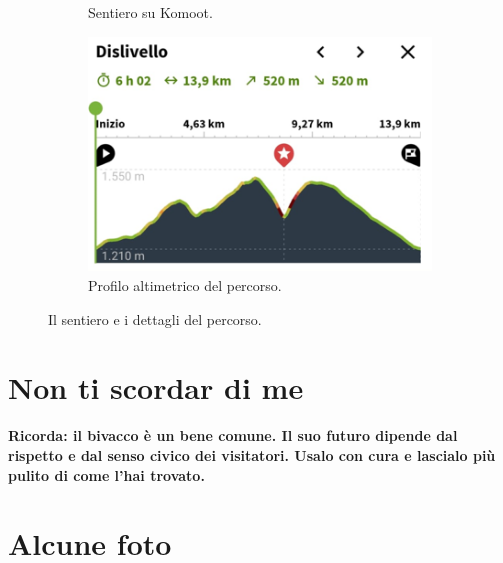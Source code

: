 \documentclass{article}
\begin{document}
\begin{figure}[htbp!]
\begin{subfigure}[t]{0.45\textwidth}
        \caption{Sentiero su Komoot.}
        \label{fig:foto_corta1}
        \vspace{1em} %
        \includegraphics[width=\textwidth]{images/profilo_altimetrico.png}
        \caption{Profilo altimetrico del percorso.}
        \label{fig:foto_corta2}
    \end{subfigure}
    \caption{Il sentiero e i dettagli del percorso.}
    \label{fig:panoramica_dettagli}
\end{figure}


\section{Non ti scordar di me}
\textbf{\textcolor{BurntOrange}{Ricorda: il bivacco è un bene comune. Il suo futuro dipende dal rispetto e dal senso civico dei visitatori. Usalo con cura e lascialo più pulito di come l'hai trovato.}}


\section{Alcune foto}
\end{document}
